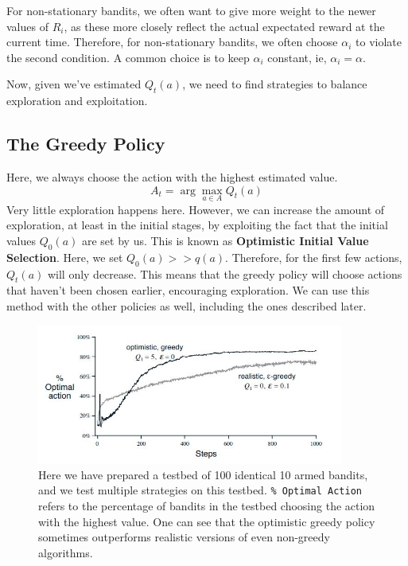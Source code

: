 \documentclass[12pt]{report}
\begin{document}
For non-stationary bandits, we often want to give more weight to the newer values of $R_{i}$, as these more closely reflect the actual expectated reward at the current time.
Therefore, for non-stationary bandits, we often choose $\alpha_{i}$ to violate the second condition. A common choice is to keep $\alpha_{i}$ constant, ie, $\alpha_{i} = \alpha$.

Now, given we've estimated $Q_{t}(a)$, we need to find strategies to balance exploration and exploitation.

\subsection{The Greedy Policy}
Here, we always choose the action with the highest estimated value.
\begin{equation}
    A_{t} = \arg\max_{a \in A} Q_{t}(a) 
\end{equation}
Very little exploration happens here. However, we can increase the amount of exploration, at least in the initial stages, by exploiting the fact that the initial values $Q_{0}(a)$ are set by us.
This is known as \textbf{Optimistic Initial Value Selection}. Here, we set $Q_{0}(a) >> q(a)$. Therefore, for the first few actions, $Q_{t}(a)$ will only decrease. This means that the greedy policy will 
choose actions that haven't been chosen earlier, encouraging exploration. We can use this method with the other policies as well, including the ones described later. 
\begin{figure}[H]
    \centering
    \includegraphics[width=0.9\textwidth]{images/optimistic-policy.jpg}
    \caption{Here we have prepared a testbed of 100 identical 10 armed bandits, and we test multiple strategies on this testbed. \texttt{\% Optimal Action} refers to the percentage of bandits in the testbed choosing the action with the highest value. One can see that the optimistic greedy policy sometimes outperforms realistic versions of even non-greedy algorithms.}
\end{figure}
\end{document}
